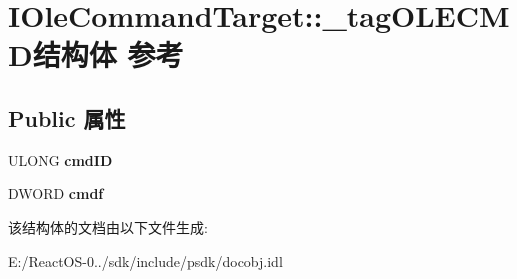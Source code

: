 \hypertarget{struct_i_ole_command_target_1_1__tag_o_l_e_c_m_d}{}\section{I\+Ole\+Command\+Target\+:\+:\+\_\+tag\+O\+L\+E\+C\+M\+D结构体 参考}
\label{struct_i_ole_command_target_1_1__tag_o_l_e_c_m_d}
\subsection*{Public 属性}
\begin{DoxyCompactItemize}
\item 
\mbox{\label{struct_i_ole_command_target_1_1__tag_o_l_e_c_m_d_ab72d252946906fcc61784398b8ca980e}} 
U\+L\+O\+NG {\bfseries cmd\+ID}
\item 
\mbox{\label{struct_i_ole_command_target_1_1__tag_o_l_e_c_m_d_a7485486233c2b8dc4a710edefad5dfb0}} 
D\+W\+O\+RD {\bfseries cmdf}
\end{DoxyCompactItemize}


该结构体的文档由以下文件生成\+:\begin{DoxyCompactItemize}
\item 
E\+:/\+React\+O\+S-\/0../sdk/include/psdk/docobj.\+idl\end{DoxyCompactItemize}
